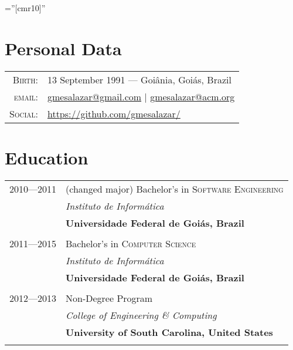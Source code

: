 \documentclass[a4paper,10pt]{article}
\begin{document}
\font\fb=''[cmr10]''

\par{\bigskip\par\vspace{8ex}}


\section{Personal Data}

\begin{tabular}{r p{3.5in}}
  \textsc{Birth:} & 13 September 1991 \hspace{0.5em}---\hspace{0.5em} Goiânia, Goiás, Brazil\\
  \textsc{email:}     & \href{mailto:gmesalazar@gmail.com}{gmesalazar@gmail.com} | \href{mailto:gmesalazar@acm.org}{gmesalazar@acm.org}\\
  \textsc{Social:} & \href{https://github.com/gmesalazar/}{https://github.com/gmesalazar/}
\end{tabular}

\section{Education}
\begin{tabular}{r|p{11cm}}

  \textsc{2010---2011} & (changed major) Bachelor's in \textsc{Software Engineering}\\ &
  \emph{Instituto de Informática}\\ &
  \textbf{Universidade Federal de Goiás, Brazil}
  \\\multicolumn{2}{c}{} \\

  \textsc{2011---2015} & Bachelor's in \textsc{Computer Science}\\ &
  \emph{Instituto de Informática}\\ &
  \textbf{Universidade Federal de Goiás, Brazil}
  \\\multicolumn{2}{c}{} \\

  \textsc{2012---2013} & Non-Degree Program\\ &
  \emph{College of Engineering \& Computing}\\ &
  \textbf{University of South Carolina, United States}
  \\\multicolumn{2}{c}{} \\

\end{tabular}
\end{document}
